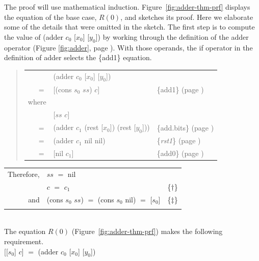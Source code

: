 The proof will use mathematical induction.
Figure~\ref{fig:adder-thm-prf}
displays the equation of the base case, $R(0)$,
and sketches its proof. Here we elaborate some of the details
that were omitted in the sketch.
The first step is
to compute the value of \textsf{(adder $c_0$ [$x_0$] [$y_0$])}
by working through the definition of the \textsf{adder} operator
(Figure \ref{fig:adder}, page \pageref{fig:adder}).
With those operands, the \textsf{if} operator in 
the definition of \textsf{adder} selects the \{add1\} equation.
\begin{quote}
\begin{tabular}{rll}
       & \textsf{(adder $c_0$ [$x_0$] [$y_0$])}              & \\
\vspace{1mm}
$=$    & \textsf{[(cons $s_0$ $ss$) $c$]}                    & \{add1\} (page \pageref {fig:adder})  \\
where  &&\\
       & \textsf{[$ss$  $c$]}                                & \\
$=$    & \textsf{(adder $c_1$ (rest [$x_0$]) (rest [$y_0$]))}& \{add.bits\} (page \pageref {fig:adder}) \\
$=$    & \textsf{(adder $c_1$ nil nil)}                      & \{\emph{rst1}\} (page \pageref {rst1}) \\
$=$    & \textsf{[nil  $c_1$]}                               & \{add0\} (page \pageref {fig:adder}) \\
\end{tabular}
\end{quote}
\setlength{\tabcolsep}{1mm}
\begin{tabular}{rll}
Therefore, & $ss$ $=$ \textsf{nil}                                       & \\
           & $c$ $=$ $c_1$                                      & \{$\dagger$\} \\
and        & \textsf{(cons $s_0$ $ss$}) $=$ \textsf{(cons $s_0$ nil)} $=$ \textsf{[$s_0$]} & \{$\ddagger$\}\\
           &                                                    & \\
\end{tabular}\\
The equation $R(0)$ (Figure~\ref{fig:adder-thm-prf}) makes the following requirement.
\vspace{1mm}\\
\hspace*{1.5cm}\textsf{[[$s_0$] $c$]} $=$ \textsf{(adder $c_0$ [$x_0$] [$y_0$])}
